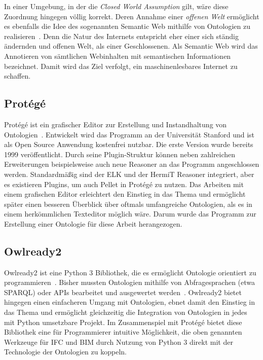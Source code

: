 In einer Umgebung, in der die \textit{Closed World Assumption} gilt, wäre diese Zuordnung hingegen völlig korrekt.
Deren Annahme einer \textit{offenen Welt} ermöglicht es ebenfalls die Idee des sogenannten \glqq{}Semantic Web\grqq{} mithilfe von Ontologien zu realisieren~\cite{SemanticWebLee}.
Denn die Natur des Internets entspricht eher einer sich ständig ändernden und \glqq{}offenen\grqq{} Welt, als einer Geschlossenen.
Als Semantic Web wird das Annotieren von sämtlichen Webinhalten mit semantischen Informationen bezeichnet.
Damit wird das Ziel verfolgt, ein maschinenlesbares Internet zu schaffen. 

\subsection{Protégé}\label{basics:protege}
Protégé ist ein grafischer Editor zur Erstellung und Instandhaltung von Ontologien~\cite{Protege}.
Entwickelt wird das Programm an der Universität Stanford und ist als Open Source Anwendung kostenfrei nutzbar.
Die erste Version wurde bereits 1999 veröffentlicht.
Durch seine Plugin-Struktur können neben zahlreichen Erweiterungen beispielsweise auch neue Reasoner an das Programm angeschlossen werden.
Standardmäßig sind der ELK und der HermiT Reasoner integriert, aber es existieren Plugins, um auch Pellet in Protégé zu nutzen.
Das Arbeiten mit einem grafischen Editor erleichtert den Einstieg in das Thema und ermöglicht später einen besseren Überblick über oftmals umfangreiche Ontologien, als es in einem herkömmlichen Texteditor möglich wäre.
Darum wurde das Programm zur Erstellung einer Ontologie für diese Arbeit herangezogen.

\subsection{Owlready2}\label{basics:owlready}
Owlready2 ist eine Python 3 Bibliothek, die es ermöglicht \glqq{}Ontologie orientiert\grqq{} zu programmieren~\cite{Owlready}.
Bisher mussten Ontologien mithilfe von Abfragesprachen (etwa SPARQL) oder APIs bearbeitet und ausgewertet werden~\cite{SPARQLF_W3C}.
Owlready2 bietet hingegen einen einfacheren Umgang mit Ontologien, ebnet damit den Einstieg in das Thema und ermöglicht gleichzeitig die Integration von Ontologien in jedes mit Python umsetzbare Projekt.
Im Zusammenspiel mit Protégé bietet diese Bibliothek eine für Programmierer intuitive Möglichkeit, die oben genannten Werkzeuge für IFC und BIM durch Nutzung von Python 3 direkt mit der Technologie der Ontologien zu koppeln.
